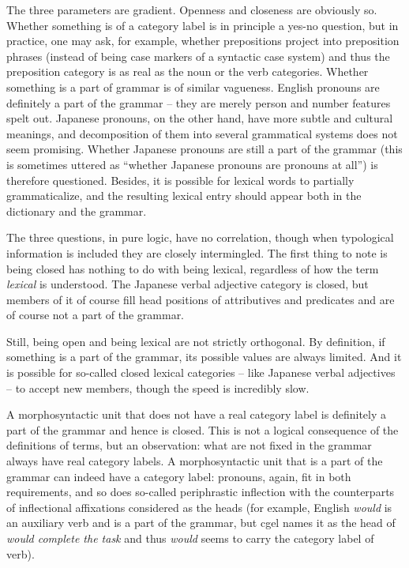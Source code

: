 \documentclass[UTF8, a4paper, oneside, scheme=plain]{ctexart}
\newcommand*{\term}[1]{\emph{#1}}
\newcommand{\corpus}[1]{\emph{#1}}
\begin{document}
The three parameters are gradient.
Openness and closeness are obviously so.
Whether something is of a category label is in principle a yes-no question,
but in practice, 
one may ask, for example, whether prepositions project into preposition phrases 
(instead of being case markers of a syntactic case system)
and thus the preposition category is as real as the noun or the verb categories.
Whether something is a part of grammar is of similar vagueness.
English pronouns are definitely a part of the grammar -- 
they are merely person and number features spelt out.
Japanese pronouns, on the other hand,
have more subtle and cultural meanings,
and decomposition of them into several grammatical systems 
does not seem promising.
Whether Japanese pronouns are still a part of the grammar 
(this is sometimes uttered as ``whether Japanese pronouns are pronouns at all'')
is therefore questioned.
Besides, it is possible for lexical words to partially grammaticalize,
and the resulting lexical entry 
should appear both in the dictionary and the grammar.

The three questions, in pure logic, have no correlation,
though when typological information is included they are closely intermingled.
The first thing to note 
is being closed has nothing to do with being lexical,
regardless of how the term \term{lexical} is understood.
The Japanese verbal adjective category is closed,
but members of it of course fill head positions of attributives and predicates
and are of course not a part of the grammar.

Still, being open and being lexical are not strictly orthogonal.
By definition, if something is a part of the grammar,
its possible values are always limited.
And it is possible for so-called closed lexical categories 
-- like Japanese verbal adjectives -- 
to accept new members, 
though the speed is incredibly slow.

A morphosyntactic unit that does not have a real category label
is definitely a part of the grammar and hence is closed.
This is not a logical consequence of the definitions of terms,
but an observation: 
what are not fixed in the grammar 
always have real category labels.
A morphosyntactic unit that is a part of the grammar
can indeed have a category label:
pronouns, again, fit in both requirements,
and so does so-called periphrastic inflection
with the counterparts of inflectional affixations 
considered as the heads
(for example, English \corpus{would} is an auxiliary verb and is a part of the grammar,
but \ac{cgel} names it as the head of \corpus{would complete the task}
and thus \corpus{would} seems to carry the category label of verb).
\end{document}
